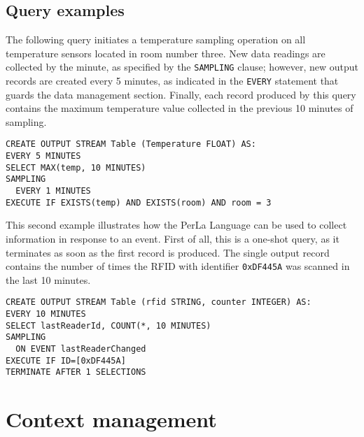 \subsection{Query examples}

The following query initiates a temperature sampling operation on all
temperature sensors located in room number three. New data readings are
collected by the minute, as specified by the \texttt{SAMPLING} clause; however,
new output records are created every 5 minutes, as indicated in the
\texttt{EVERY} statement that guards the data management section. Finally, each
record produced by this query contains the maximum temperature value collected
in the previous 10 minutes of sampling.

\begin{lstlisting}
CREATE OUTPUT STREAM Table (Temperature FLOAT) AS:
EVERY 5 MINUTES
SELECT MAX(temp, 10 MINUTES)
SAMPLING
  EVERY 1 MINUTES
EXECUTE IF EXISTS(temp) AND EXISTS(room) AND room = 3
\end{lstlisting}


This second example illustrates how the PerLa Language can be used to collect
information in response to an event. First of all, this is a one-shot query, as
it terminates as soon as the first record is produced. The single output record
contains the number of times the RFID with identifier \texttt{0xDF445A} was
scanned in the last 10 minutes.

\begin{lstlisting}
CREATE OUTPUT STREAM Table (rfid STRING, counter INTEGER) AS:
EVERY 10 MINUTES
SELECT lastReaderId, COUNT(*, 10 MINUTES)
SAMPLING
  ON EVENT lastReaderChanged
EXECUTE IF ID=[0xDF445A]
TERMINATE AFTER 1 SELECTIONS
\end{lstlisting}


\section{Context management}

